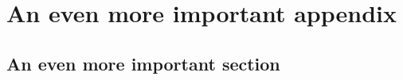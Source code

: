 \documentclass[debug]{phd}
\begin{document}
	\chapter{An even more important appendix}
	\label{app:EMIA}
		\section{An even more important section}\label{appsec:evenmore}
			
\end{document}
